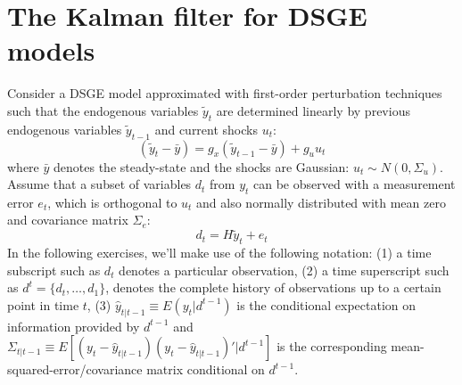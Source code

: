 \section[The Kalman filter for DSGE models]{The Kalman filter for DSGE models\label{ex:KalmanFilterDSGE}}
Consider a DSGE model approximated with first-order perturbation techniques such that the endogenous variables \(\tilde{y}_t\) are determined linearly by previous endogenous variables \(\tilde{y}_{t-1}\) and current shocks \(u_t\):
\begin{equation*}
(\tilde{y}_t - \bar{y}) = g_x (\tilde{y}_{t-1} - \bar{y}) + g_u u_t
\end{equation*}
where \(\bar{y}\) denotes the steady-state and the shocks are Gaussian: \(u_t \sim N(0,\Sigma_u)\).
Assume that a subset of variables \(d_t\) from \(y_t\) can be observed with a measurement error \(e_t\),
  which is orthogonal to \(u_t\) and also normally distributed with mean zero and covariance matrix \(\Sigma_e\):
\begin{equation*}
d_t = H \tilde{y}_t + e_t
\end{equation*}
In the following exercises, we'll make use of the following notation:
(1) a time subscript such as \(d_t\) denotes a particular observation,
(2) a time superscript such as \(d^t=\{d_t,\ldots ,d_1\} \), denotes the complete history of observations up to a certain point in time \(t\),
(3) \(\hat{y}_{t|t-1} \equiv E(y_t|d^{t-1})\) is the conditional expectation on information provided by \(d^{t-1}\)
  and \(\Sigma_{t|t-1} \equiv E\left[ (y_t-\hat{y}_{t|t-1}) (y_t-\hat{y}_{t|t-1})'|d^{t-1}\right]\) is the corresponding mean-squared-error/covariance matrix conditional on \(d^{t-1}\).

